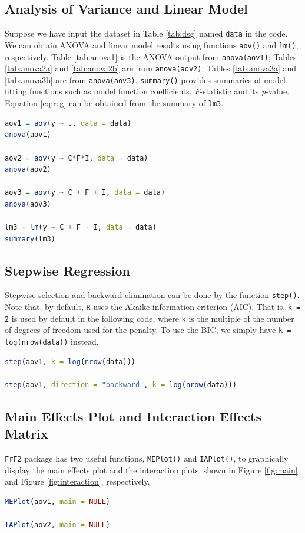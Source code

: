 \documentclass[11pt]{article}
\begin{document}
\subsection{Analysis of Variance and Linear Model}\label{app:anova}
Suppose we have input the dataset in Table \ref{tab:dsg} named \texttt{data} in the code. We can obtain ANOVA and linear model results using functions \texttt{aov()} and \texttt{lm()}, respectively. Table \ref{tab:anova1} is the ANOVA output from \texttt{anova(aov1)}; Tables \ref{tab:anova2a} and \ref{tab:anova2b} are from \texttt{anova(aov2)}; Tables \ref{tab:anova3a} and \ref{tab:anova3b} are from \texttt{anova(aov3)}. \texttt{summary()} provides summaries of model fitting functions such as model function coefficients, \textit{F}-statistic and its \textit{p}-value. Equation \ref{eq:reg} can be obtained from the summary of \texttt{lm3}.
\begin{file}[dae.r]
\begin{lstlisting}[language = R]
aov1 = aov(y ~ ., data = data)
anova(aov1)

aov2 = aov(y ~ C*F*I, data = data)
anova(aov2)

aov3 = aov(y ~ C + F + I, data = data)
anova(aov3)

lm3 = lm(y ~ C + F + I, data = data)
summary(lm3)
\end{lstlisting}
\end{file}

\subsection{Stepwise Regression}\label{app:step}
Stepwise selection and backward elimination can be done by the function \texttt{step()}. Note that, by default, \texttt{R} uses the Akaike information criterion (AIC). That is, \texttt{k = 2} is used by default in the following code, where \texttt{k} is the multiple of the number of degrees of freedom used for the penalty. To use the BIC, we simply have \texttt{k = log(nrow(data))} instead.
\begin{file}[dae.r]
\begin{lstlisting}[language = R]
step(aov1, k = log(nrow(data)))

step(aov1, direction = "backward", k = log(nrow(data)))
\end{lstlisting}
\end{file}

\subsection{Main Effects Plot and Interaction Effects Matrix}\label{app:plots}
\texttt{FrF2} package has two useful functions, \texttt{MEPlot()} and \texttt{IAPlot()}, to graphically display the main effects plot and the interaction plots, shown in Figure \ref{fig:main} and Figure \ref{fig:interaction}, respectively.
\begin{file}[dae.r]
\begin{lstlisting}[language = R]
MEPlot(aov1, main = NULL)

IAPlot(aov2, main = NULL)
\end{lstlisting}
\end{file}
\end{document}
